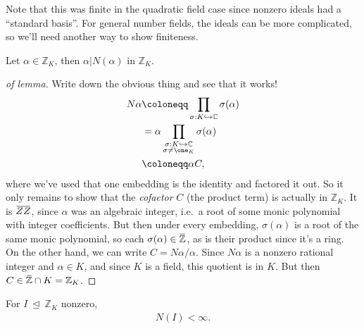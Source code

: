\begin{remark}

Note that this was finite in the quadratic field case since nonzero
ideals had a ``standard basis''. For general number fields, the ideals
can be more complicated, so we'll need another way to show finiteness.

\end{remark}

\begin{lemma}

Let \(\alpha\in {\mathbb{Z}}_K\), then
\(\alpha\mathrel{\Big|}N( \alpha)\) in \({\mathbb{Z}}_K\).

\end{lemma}

\begin{proof}[of lemma]

Write down the obvious thing and see that it works!
\begin{align*}
N \alpha 
&\coloneqq\prod_{ \sigma: K \hookrightarrow{\mathbb{C}}} \sigma( \alpha) \\
&= \alpha \prod_{ \substack{ \sigma: K \hookrightarrow{\mathbb{C}}\\ \sigma\neq \one_K } } \sigma( \alpha) \\
&\coloneqq\alpha C 
,\end{align*}
where we've used that one embedding is the identity and factored it out.
So it only remains to show that the \emph{cofactor} \(C\) (the product
term) is actually in \({\mathbb{Z}}_K\). It is
\(\mkern 1.5mu\overline{\mkern-1.5muZZ\mkern-1.5mu}\mkern 1.5mu\), since
\(\alpha\) was an algebraic integer, i.e.~a root of some monic
polynomial with integer coefficients. But then under every embedding,
\(\sigma( \alpha)\) is a root of the same monic polynomial, so each
\(\sigma( \alpha) \in \mkern 1.5mu\overline{\mkern-1.5mu{\mathbb{Z}}\mkern-1.5mu}\mkern 1.5mu\),
as is their product since it's a ring. On the other hand, we can write
\(C = N \alpha/ \alpha\). Since \(N \alpha\) is a nonzero rational
integer and \(\alpha\in K\), and since \(K\) is a field, this quotient
is in \(K\). But then
\(C \in \mkern 1.5mu\overline{\mkern-1.5mu{\mathbb{Z}}\mkern-1.5mu}\mkern 1.5mu \cap K = {\mathbb{Z}}_K\).

\end{proof}

\begin{proposition}

For \(I{~\trianglelefteq~}{\mathbb{Z}}_K\) nonzero,
\begin{align*}
N(I) < \infty 
.\end{align*}

\end{proposition}

